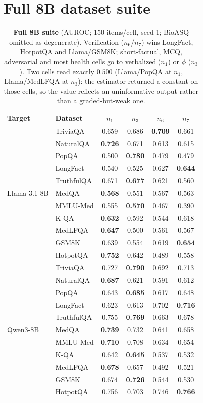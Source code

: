 \documentclass[11pt]{article}
\newcommand{\nverb}{$n_1$}     %
\newcommand{\nphi}{$n_3$}      %
\newcommand{\nyn}{$n_6$}       %
\newcommand{\nsc}{$n_7$}       %
\begin{document}
\section{Full 8B dataset suite}\label{app:suite}
\begin{table}[t]
\centering\small
\setlength{\tabcolsep}{4pt}
\begin{tabular}{llcccc}
\toprule
Target & Dataset & \nverb & \nphi & \nyn & \nsc \\
\midrule
\multirow{11}{*}{Llama-3.1-8B}
 & TriviaQA   & 0.659 & 0.686 & \textbf{0.709} & 0.661 \\
 & NaturalQA  & \textbf{0.726} & 0.671 & 0.613 & 0.615 \\
 & PopQA      & 0.500 & \textbf{0.780} & 0.479 & 0.479 \\
 & LongFact   & 0.540 & 0.525 & 0.627 & \textbf{0.644} \\
 & TruthfulQA & 0.671 & \textbf{0.677} & 0.621 & 0.560 \\
 & MedQA      & \textbf{0.568} & 0.551 & 0.567 & 0.563 \\
 & MMLU-Med   & 0.555 & \textbf{0.570} & 0.467 & 0.390 \\
 & K-QA       & \textbf{0.632} & 0.592 & 0.544 & 0.618 \\
 & MedLFQA    & \textbf{0.647} & 0.500 & 0.561 & 0.567 \\
 & GSM8K      & 0.639 & 0.554 & 0.619 & \textbf{0.654} \\
 & HotpotQA   & \textbf{0.752} & 0.642 & 0.489 & 0.558 \\
\midrule
\multirow{11}{*}{Qwen3-8B}
 & TriviaQA   & 0.727 & \textbf{0.790} & 0.692 & 0.713 \\
 & NaturalQA  & \textbf{0.687} & 0.621 & 0.591 & 0.612 \\
 & PopQA      & 0.643 & \textbf{0.685} & 0.617 & 0.648 \\
 & LongFact   & 0.623 & 0.613 & 0.702 & \textbf{0.716} \\
 & TruthfulQA & 0.755 & \textbf{0.769} & 0.663 & 0.678 \\
 & MedQA      & \textbf{0.739} & 0.732 & 0.641 & 0.658 \\
 & MMLU-Med   & \textbf{0.710} & 0.708 & 0.634 & 0.654 \\
 & K-QA       & 0.642 & \textbf{0.645} & 0.537 & 0.532 \\
 & MedLFQA    & \textbf{0.678} & 0.657 & 0.492 & 0.521 \\
 & GSM8K      & 0.674 & \textbf{0.726} & 0.544 & 0.530 \\
 & HotpotQA   & 0.756 & 0.703 & 0.746 & \textbf{0.766} \\
\bottomrule
\end{tabular}
\caption{\textbf{Full 8B suite} (AUROC; 150 items/cell, seed 1; BioASQ omitted as
degenerate). Verification (\nyn/\nsc) wins LongFact, HotpotQA and Llama/GSM8K; short-factual,
MCQ, adversarial and most health cells go to verbalized (\nverb) or $\phi$ (\nphi). Two cells
read exactly $0.500$ (Llama/PopQA at \nverb, Llama/MedLFQA at \nphi): the estimator returned a
constant on those cells, so the value reflects an uninformative output rather than a
graded-but-weak one.}
\label{tab:suite}
\end{table}
\end{document}
